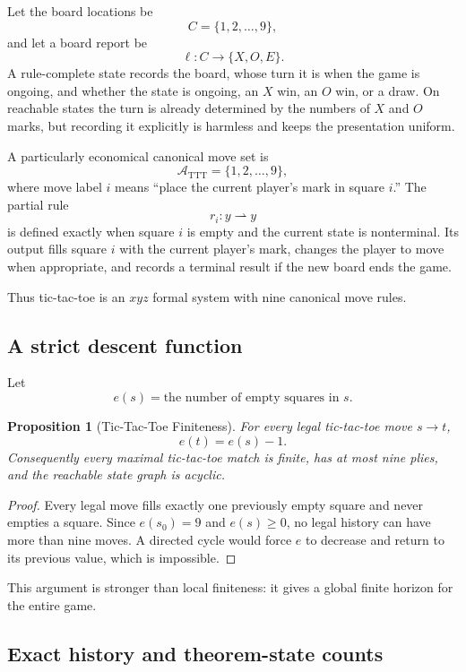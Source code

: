 \documentclass[11pt]{article}
\newtheorem{proposition}[theorem]{Proposition}
\theoremstyle{definition}
\theoremstyle{remark}
\begin{document}
Let the board locations be
\[
C=\{1,2,\ldots,9\},
\]
and let a board report be
\[
\ell:C\to\{X,O,E\}.
\]
A rule-complete state records the board, whose turn it is when the game is ongoing, and whether the state is ongoing, an $X$ win, an $O$ win, or a draw. On reachable states the turn is already determined by the numbers of $X$ and $O$ marks, but recording it explicitly is harmless and keeps the presentation uniform.

A particularly economical canonical move set is
\[
\mathcal A_{\mathrm{TTT}}=\{1,2,\ldots,9\},
\]
where move label $i$ means ``place the current player's mark in square $i$.'' The partial rule
\[
r_i:y\rightharpoonup y
\]
is defined exactly when square $i$ is empty and the current state is nonterminal. Its output fills square $i$ with the current player's mark, changes the player to move when appropriate, and records a terminal result if the new board ends the game.

Thus tic-tac-toe is an $xyz$ formal system with nine canonical move rules.

\subsection{A strict descent function}

Let
\[
e(s)=\text{the number of empty squares in }s.
\]

\begin{proposition}[Tic-Tac-Toe Finiteness]
For every legal tic-tac-toe move $s\to t$,
\[
\boxed{e(t)=e(s)-1.}
\]
Consequently every maximal tic-tac-toe match is finite, has at most nine plies, and the reachable state graph is acyclic.
\end{proposition}

\begin{proof}
Every legal move fills exactly one previously empty square and never empties a square. Since $e(s_0)=9$ and $e(s)\ge0$, no legal history can have more than nine moves. A directed cycle would force $e$ to decrease and return to its previous value, which is impossible.
\end{proof}

This argument is stronger than local finiteness: it gives a global finite horizon for the entire game.

\subsection{Exact history and theorem-state counts}
\end{document}

